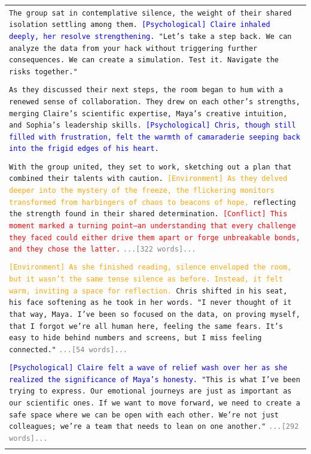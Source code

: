 \documentclass[letterpaper]{article} %
\begin{document}
\begin{small}
\begin{longtable}{p{\textwidth}}
    \texttt{The group sat in contemplative silence, the weight of their shared isolation settling among them. \textcolor{blue}{[Psychological] Claire inhaled deeply, her resolve strengthening.} "Let's take a step back. We can analyze the data from your hack without triggering further consequences. We can create a simulation. Test it. Navigate the risks together."} \\\\

    \texttt{As they discussed their next steps, the room began to hum with a renewed sense of collaboration. They drew on each other's strengths, merging Claire's scientific expertise, Maya's creative intuition, and Sophia's leadership skills. \textcolor{blue}{[Psychological] Chris, though still filled with frustration, felt the warmth of camaraderie seeping back into the frigid edges of his heart.}} \\\\

    \texttt{With the group united, they set to work, sketching out a plan that combined their talents with caution. \textcolor{orange}{[Environment] As they delved deeper into the mystery of the freeze, the flickering monitors transformed from harbingers of chaos to beacons of hope,} reflecting the strength found in their shared determination. \textcolor{red}{[Conflict] This moment marked a turning point—an understanding that every challenge they faced could either drive them apart or forge unbreakable bonds, and they chose the latter.}}
    \texttt{\textcolor{gray}{...[322 words]...}} \\\\

    \texttt{\textcolor{orange}{[Environment] As she finished reading, silence enveloped the room, but it wasn't the same tense silence as before. Instead, it felt warm, inviting a space for reflection.} Chris shifted in his seat, his face softening as he took in her words. "I never thought of it that way, Maya. I've been so focused on the data, on proving myself, that I forgot we're all human here, feeling the same fears. It's easy to hide behind numbers and screens, but I miss feeling connected."}
    \texttt{\textcolor{gray}{...[54 words]...}} \\\\

    \texttt{\textcolor{blue}{[Psychological] Claire felt a wave of relief wash over her as she realized the significance of Maya's honesty.} "This is what I've been trying to express. Our emotional journeys are just as important as our scientific ones. If we want to move forward, we need to create a safe space where we can be open with each other. We're not just colleagues; we're a team that needs to lean on one another."}
    \texttt{\textcolor{gray}{...[292 words]...}} \\\\


\end{longtable}
\end{small}
\end{document}
